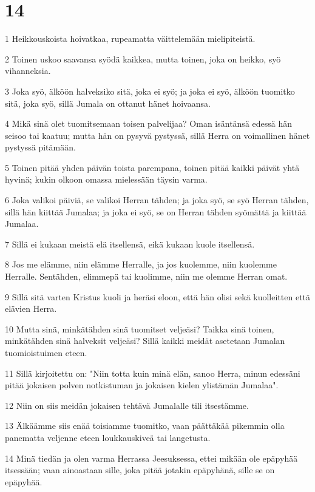 \chapter{14}

\par 1 Heikkouskoista hoivatkaa, rupeamatta väittelemään mielipiteistä.
\par 2 Toinen uskoo saavansa syödä kaikkea, mutta toinen, joka on heikko, syö vihanneksia.
\par 3 Joka syö, älköön halveksiko sitä, joka ei syö; ja joka ei syö, älköön tuomitko sitä, joka syö, sillä Jumala on ottanut hänet hoivaansa.
\par 4 Mikä sinä olet tuomitsemaan toisen palvelijaa? Oman isäntänsä edessä hän seisoo tai kaatuu; mutta hän on pysyvä pystyssä, sillä Herra on voimallinen hänet pystyssä pitämään.
\par 5 Toinen pitää yhden päivän toista parempana, toinen pitää kaikki päivät yhtä hyvinä; kukin olkoon omassa mielessään täysin varma.
\par 6 Joka valikoi päiviä, se valikoi Herran tähden; ja joka syö, se syö Herran tähden, sillä hän kiittää Jumalaa; ja joka ei syö, se on Herran tähden syömättä ja kiittää Jumalaa.
\par 7 Sillä ei kukaan meistä elä itsellensä, eikä kukaan kuole itsellensä.
\par 8 Jos me elämme, niin elämme Herralle, ja jos kuolemme, niin kuolemme Herralle. Sentähden, elimmepä tai kuolimme, niin me olemme Herran omat.
\par 9 Sillä sitä varten Kristus kuoli ja heräsi eloon, että hän olisi sekä kuolleitten että elävien Herra.
\par 10 Mutta sinä, minkätähden sinä tuomitset veljeäsi? Taikka sinä toinen, minkätähden sinä halveksit veljeäsi? Sillä kaikki meidät asetetaan Jumalan tuomioistuimen eteen.
\par 11 Sillä kirjoitettu on: "Niin totta kuin minä elän, sanoo Herra, minun edessäni pitää jokaisen polven notkistuman ja jokaisen kielen ylistämän Jumalaa".
\par 12 Niin on siis meidän jokaisen tehtävä Jumalalle tili itsestämme.
\par 13 Älkäämme siis enää toisiamme tuomitko, vaan päättäkää pikemmin olla panematta veljenne eteen loukkauskiveä tai langetusta.
\par 14 Minä tiedän ja olen varma Herrassa Jeesuksessa, ettei mikään ole epäpyhää itsessään; vaan ainoastaan sille, joka pitää jotakin epäpyhänä, sille se on epäpyhää.
